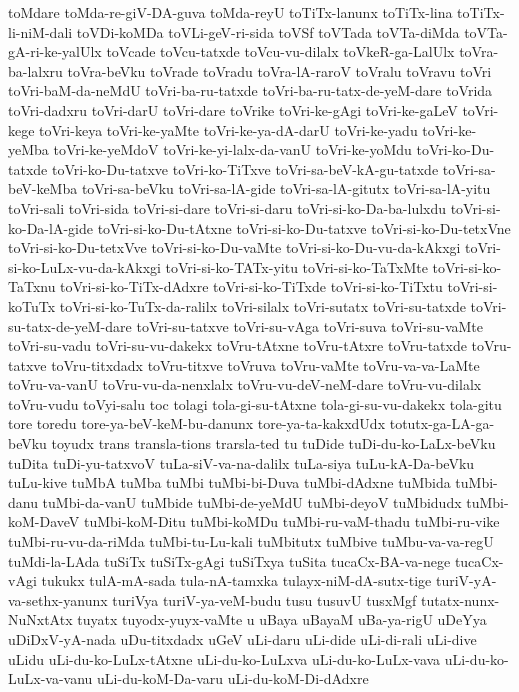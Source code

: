 {toMdare
toMda-re-giV-DA-guva
toMda-reyU
toTiTx-lanunx
toTiTx-lina
toTiTx-li-niM-dali
toVDi-koMDa
toVLi-geV-ri-sida
toVSf
toVTada
toVTa-diMda
toVTa-gA-ri-ke-yalUlx
toVcade
toVcu-tatxde
toVcu-vu-dilalx
toVkeR-ga-LalUlx
toVra-ba-lalxru
toVra-beVku
toVrade
toVradu
toVra-lA-raroV
toVralu
toVravu
toVri
toVri-baM-da-neMdU
toVri-ba-ru-tatxde
toVri-ba-ru-tatx-de-yeM-dare
toVrida
toVri-dadxru
toVri-darU
toVri-dare
toVrike
toVri-ke-gAgi
toVri-ke-gaLeV
toVri-kege
toVri-keya
toVri-ke-yaMte
toVri-ke-ya-dA-darU
toVri-ke-yadu
toVri-ke-yeMba
toVri-ke-yeMdoV
toVri-ke-yi-lalx-da-vanU
toVri-ke-yoMdu
toVri-ko-Du-tatxde
toVri-ko-Du-tatxve
toVri-ko-TiTxve
toVri-sa-beV-kA-gu-tatxde
toVri-sa-beV-keMba
toVri-sa-beVku
toVri-sa-lA-gide
toVri-sa-lA-gitutx
toVri-sa-lA-yitu
toVri-sali
toVri-sida
toVri-si-dare
toVri-si-daru
toVri-si-ko-Da-ba-lulxdu
toVri-si-ko-Da-lA-gide
toVri-si-ko-Du-tAtxne
toVri-si-ko-Du-tatxve
toVri-si-ko-Du-tetxVne
toVri-si-ko-Du-tetxVve
toVri-si-ko-Du-vaMte
toVri-si-ko-Du-vu-da-kAkxgi
toVri-si-ko-LuLx-vu-da-kAkxgi
toVri-si-ko-TATx-yitu
toVri-si-ko-TaTxMte
toVri-si-ko-TaTxnu
toVri-si-ko-TiTx-dAdxre
toVri-si-ko-TiTxde
toVri-si-ko-TiTxtu
toVri-si-koTuTx
toVri-si-ko-TuTx-da-ralilx
toVri-silalx
toVri-sutatx
toVri-su-tatxde
toVri-su-tatx-de-yeM-dare
toVri-su-tatxve
toVri-su-vAga
toVri-suva
toVri-su-vaMte
toVri-su-vadu
toVri-su-vu-dakekx
toVru-tAtxne
toVru-tAtxre
toVru-tatxde
toVru-tatxve
toVru-titxdadx
toVru-titxve
toVruva
toVru-vaMte
toVru-va-va-LaMte
toVru-va-vanU
toVru-vu-da-nenxlalx
toVru-vu-deV-neM-dare
toVru-vu-dilalx
toVru-vudu
toVyi-salu
toc
tolagi
tola-gi-su-tAtxne
tola-gi-su-vu-dakekx
tola-gitu
tore
toredu
tore-ya-beV-keM-bu-danunx
tore-ya-ta-kakxdUdx
totutx-ga-LA-ga-beVku
toyudx
trans
transla-tions
trarsla-ted
tu
tuDide
tuDi-du-ko-LaLx-beVku
tuDita
tuDi-yu-tatxvoV
tuLa-siV-va-na-dalilx
tuLa-siya
tuLu-kA-Da-beVku
tuLu-kive
tuMbA
tuMba
tuMbi
tuMbi-bi-Duva
tuMbi-dAdxne
tuMbida
tuMbi-danu
tuMbi-da-vanU
tuMbide
tuMbi-de-yeMdU
tuMbi-deyoV
tuMbidudx
tuMbi-koM-DaveV
tuMbi-koM-Ditu
tuMbi-koMDu
tuMbi-ru-vaM-thadu
tuMbi-ru-vike
tuMbi-ru-vu-da-riMda
tuMbi-tu-Lu-kali
tuMbitutx
tuMbive
tuMbu-va-va-regU
tuMdi-la-LAda
tuSiTx
tuSiTx-gAgi
tuSiTxya
tuSita
tucaCx-BA-va-nege
tucaCx-vAgi
tukukx
tulA-mA-sada
tula-nA-tamxka
tulayx-niM-dA-sutx-tige
turiV-yA-va-sethx-yanunx
turiVya
turiV-ya-veM-budu
tusu
tusuvU
tusxMgf
tutatx-nunx-NuNxtAtx
tuyatx
tuyodx-yuyx-vaMte
u
uBaya
uBayaM
uBa-ya-rigU
uDeYya
uDiDxV-yA-nada
uDu-titxdadx
uGeV
uLi-daru
uLi-dide
uLi-di-rali
uLi-dive
uLidu
uLi-du-ko-LuLx-tAtxne
uLi-du-ko-LuLxva
uLi-du-ko-LuLx-vava
uLi-du-ko-LuLx-va-vanu
uLi-du-koM-Da-varu
uLi-du-koM-Di-dAdxre
}
